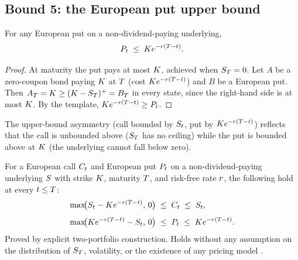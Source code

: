 \subsection{Bound 5: the European put upper bound}
\label{sec:ch14_bound5}

\begin{proposition}
\label{prop:put_upper_bound}
For any European put on a non-dividend-paying underlying,
\begin{equation}
  P_t \;\leq\; K e^{-r(T - t)}.
  \label{eq:put_upper_bound}
\end{equation}
\end{proposition}

\begin{proof}
At maturity the put pays at most $K$, achieved when
$S_T = 0$. Let $A$ be a zero-coupon bond paying $K$
at $T$ (cost $K e^{-r(T-t)}$) and $B$ be a
European put. Then $A_T = K \geq (K - S_T)^+ =
B_T$ in every state, since the right-hand side is at most
$K$. By the template, $K e^{-r(T-t)}
\geq P_t$.
\end{proof}

The upper-bound asymmetry (call bounded by $S_t$, put by
$K e^{-r(T-t)}$) reflects that the call is
unbounded above ($S_T$ has no ceiling) while the put is
bounded above at $K$ (the underlying cannot fall below
zero).

\begin{keyfactbox}
\label{kf:option_bounds}
For a European call $C_t$ and European put $P_t$ on a
non-dividend-paying underlying $S$ with strike $K$,
maturity $T$, and risk-free rate $r$, the following
hold at every $t \leq T$:
\begin{align}
  \max\!\bigl(S_t - K e^{-r(T-t)},\, 0\bigr)
    &\;\leq\; C_t \;\leq\; S_t,
    \label{eq:call_band} \\[4pt]
  \max\!\bigl(K e^{-r(T-t)} - S_t,\, 0\bigr)
    &\;\leq\; P_t \;\leq\; K e^{-r(T-t)}.
    \label{eq:put_band}
\end{align}
Proved by explicit two-portfolio construction. Holds without any
assumption on the distribution of $S_T$, volatility, or the
existence of any pricing model
\citep{damodaranOptionsArbitrage}.
\end{keyfactbox}

